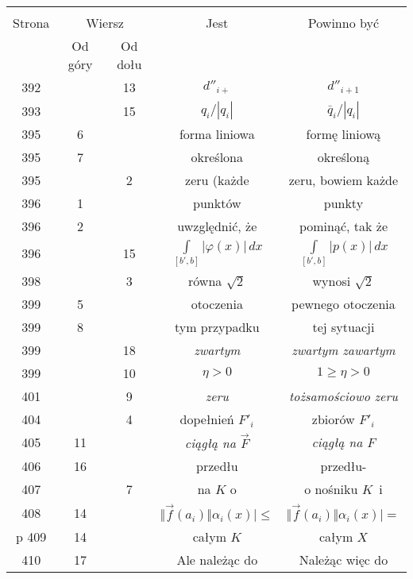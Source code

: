 \documentclass[a4paper,11pt]{article}
\begin{document}
\begin{center}

  \begin{tabular}{|c|c|c|c|c|}
    \hline
    & \multicolumn{2}{c|}{} & & \\
    Strona & \multicolumn{2}{c|}{Wiersz} & Jest
                              & Powinno być \\ \cline{2-3}
    & Od góry & Od dołu & & \\
    \hline
    392 & & 13 & $d''_{ i + }$ & $d''_{ i + 1 }$ \\
    393 & & 15 & $q_{ i } / | q_{ i } |$ & $\bar{ q }_{ i } / | q_{ i } |$ \\
    395 &  6 & & forma liniowa & formę liniową \\
    395 &  7 & & określona & określoną \\
    395 & &  2 & zeru (każde & zeru, bowiem każde \\
    396 &  1 & & punktów & punkty \\
    396 &  2 & & uwzględnić, że & pominąć, tak że \\
    396 & & 15 & $\int\limits_{ [ b', b ] } | \varphi( x ) | \, dx$
           & $\int\limits_{ [ b', b ] } | p( x ) | \, dx$ \\
    398 & &  3 & równa $\sqrt{ 2 }$ & wynosi $\sqrt{ 2 }$ \\
    399 &  5 & & otoczenia & pewnego otoczenia \\
    399 &  8 & & tym przypadku & tej sytuacji \\
    399 & & 18 & \emph{zwartym} & \emph{zwartym zawartym} \\
    399 & & 10 & $\eta > 0$ & $1 \geq \eta > 0$ \\
    401 & &  9 & \emph{zeru} & \emph{tożsamościowo zeru} \\
    404 & &  4 & dopełnień $F'_{ i }$ & zbiorów $F'_{ i }$ \\
    405 & 11 & & \textit{ciągłą na $\vec{ F }$} & \textit{ciągłą na $F$} \\
    406 & 16 & & przedłu & przedłu- \\
    407 & &  7 & na $K$ o & o nośniku $K$~i \\
    408 & 14 & & $\Vert \vec{ f }( a_{ i } ) \Vert \alpha_{ i }( x ) \big| \leq$
           & $\Vert \vec{ f }( a_{ i } ) \Vert \alpha_{ i }( x ) \big| =$ \\p
    409 & 14 & & całym $K$ & całym $X$ \\
    410 & 17 & & Ale należąc do & Należąc więc do \\

\end{tabular}
\end{center}
\end{document}
